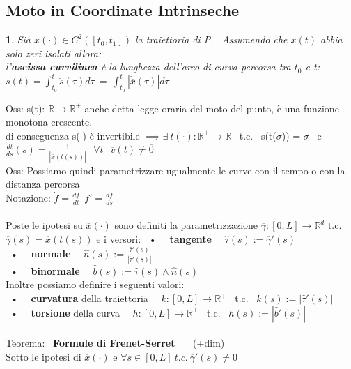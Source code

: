 \documentclass{article}
\theoremstyle{unnumbered}
\theoremstyle{unnumbered1}
\newtheorem* {theoremT1}{}
\newenvironment{Ndefi}{\begin{gBox}\begin{theoremT1}}{\end{theoremT1}\end{gBox}}
\begin{document}
\subsection{Moto in Coordinate Intrinseche}
%
\begin{Ndefi}
Sia $\overline{x}(\cdot) \in C^2([t_0,t_1])$ la traiettoria di P. \ Assumendo che $\overline{x}(t)$ abbia solo zeri isolati allora: \\ 
l'\textbf{ascissa curvilinea} è la lunghezza dell'arco di curva percorsa tra $t_0$ e t: \ \ $s(t)=\int_{t_0}^t \dot{s}(\tau) d\tau \ = \ \int_{t_0}^t |\dot{\overline{x}}(\tau)| d\tau$
\end{Ndefi}
%
Oss: s(t): $\mathbb{R}\rightarrow\mathbb{R}^+$ anche detta legge oraria del moto del punto, è una funzione monotona crescente.\\
%
\phantom{Oss: }di conseguenza s($\cdot$) è invertibile $\implies \exists \ t(\cdot):\mathbb{R}^+\rightarrow\mathbb{R}$ \ t.c. \ s(t($\sigma$)) = $\sigma$ \ e \ $\frac{dt}{ds}(s)= \frac{1}{|\dot{\overline{x}}(t(s))|}\ \ \ \forall t \ |\ \overline{v}(t)\neq \overline{0} $\\
Oss: Possiamo quindi parametrizzare ugualmente le curve con il tempo o con la distanza percorsa\\
Notazione: $\dot{f}=\frac{df}{dt} \ \ f'=\frac{df}{ds}$ \\ \\
%
%
%
Poste le ipotesi su $\overline{x}(\cdot)$ sono definiti la parametrizzazione $\overline{\gamma}:[0,L]\rightarrow\mathbb{R}^d$ t.c. $\overline{\gamma}(s)=\overline{x}(t(s))$ e i versori:
\ • \ \ \textbf{tangente} \ \ $\hat{\tau}(s) := \overline{\gamma}'(s) $ \\
\ • \ \ \textbf{normale} \ \ $\hat{n}(s):=\frac{\hat{\tau}'(s)}{|\hat{\tau}'(s)|}$\\
\ • \ \ \textbf{binormale} \ \ $\hat{b}(s):=\hat{\tau}(s)\wedge\hat{n}(s)$ \\
Inoltre possiamo definire i seguenti valori: \\
\ • \ \ \textbf{curvatura} della traiettoria \ \ $k:[0,L]\rightarrow\mathbb{R}^+$ \ t.c. \ $k(s) := |\hat{\tau}'(s)|$\\
\ • \ \ \textbf{torsione} della curva \ \  $h:[0,L]\rightarrow\mathbb{R}^+$ \ t.c. \ $h(s) := |\hat{b}'(s)|$ \\ \\
%
%
%
Teorema: \ \textbf{Formule di Frenet-Serret} \ \ \ (+dim)\\
\phantom{\ } Sotto le ipotesi di $\overline{x}(\cdot)$ e $\forall s \in [0,L] \ t.c. \ \overline{\gamma}'(s)\neq 0$ \\
\end{document}
